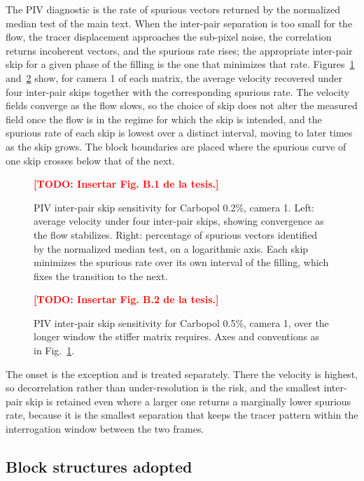 \documentclass[%
  aip,
  pof,
  reprint,
  floatfix
]{revtex4-2}
\newcommand{\todo}[1]{\textcolor{red}{\textbf{[TODO: #1]}}}
\begin{document}
The PIV diagnostic is the rate of spurious vectors returned by the normalized median test of the main text. When the inter-pair separation is too small for the flow, the tracer displacement approaches the sub-pixel noise, the correlation returns incoherent vectors, and the spurious rate rises; the appropriate inter-pair skip for a given phase of the filling is the one that minimizes that rate. Figures~\ref{fig:sup_piv_uod_02} and~\ref{fig:sup_piv_uod_05} show, for camera 1 of each matrix, the average velocity recovered under four inter-pair skips together with the corresponding spurious rate. The velocity fields converge as the flow slows, so the choice of skip does not alter the measured field once the flow is in the regime for which the skip is intended, and the spurious rate of each skip is lowest over a distinct interval, moving to later times as the skip grows. The block boundaries are placed where the spurious curve of one skip crosses below that of the next.

\begin{figure}[htb]
    \centering
    \todo{Insertar Fig. B.1 de la tesis.}
    \caption{PIV inter-pair skip sensitivity for Carbopol 0.2\%, camera 1. Left: average velocity under four inter-pair skips, showing convergence as the flow stabilizes. Right: percentage of spurious vectors identified by the normalized median test, on a logarithmic axis. Each skip minimizes the spurious rate over its own interval of the filling, which fixes the transition to the next.}
    \label{fig:sup_piv_uod_02}
\end{figure}

\begin{figure}[htb]
    \centering
    \todo{Insertar Fig. B.2 de la tesis.}
    \caption{PIV inter-pair skip sensitivity for Carbopol 0.5\%, camera 1, over the longer window the stiffer matrix requires. Axes and conventions as in Fig.~\ref{fig:sup_piv_uod_02}.}
    \label{fig:sup_piv_uod_05}
\end{figure}

The onset is the exception and is treated separately. There the velocity is highest, so decorrelation rather than under-resolution is the risk, and the smallest inter-pair skip is retained even where a larger one returns a marginally lower spurious rate, because it is the smallest separation that keeps the tracer pattern within the interrogation window between the two frames.

\subsection{Block structures adopted}
\end{document}
